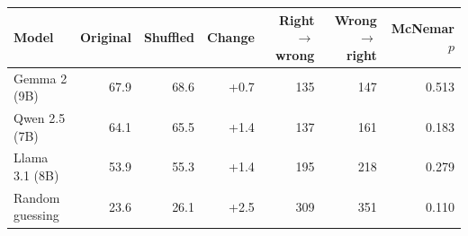 \begin{tabular}{@{}lrrrrrr@{}}
\toprule
Model & Original & Shuffled & Change & Right$\to$wrong & Wrong$\to$right & McNemar $p$ \\
\midrule
Gemma 2 (9B) & 67.9 & 68.6 & +0.7 & 135 & 147 & 0.513 \\
Qwen 2.5 (7B) & 64.1 & 65.5 & +1.4 & 137 & 161 & 0.183 \\
Llama 3.1 (8B) & 53.9 & 55.3 & +1.4 & 195 & 218 & 0.279 \\
Random guessing & 23.6 & 26.1 & +2.5 & 309 & 351 & 0.110 \\
\bottomrule
\end{tabular}
